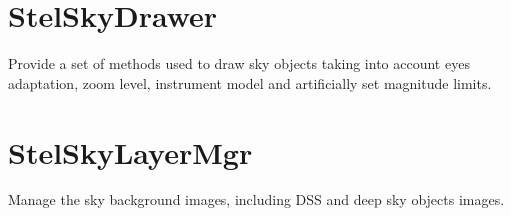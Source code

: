 \section{StelSkyDrawer}
\label{sec:ScriptingAPI:StelSkyDrawer}

Provide a set of methods used to draw sky objects taking into account eyes adaptation, zoom level, instrument model and artificially set magnitude limits.

\section{StelSkyLayerMgr}
\label{sec:ScriptingAPI:StelSkyLayerMgr}

Manage the sky background images, including DSS and deep sky objects images.
